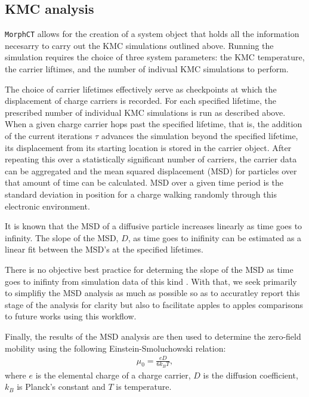 \subsection{KMC analysis}
\label{kmcanalysis}
\texttt{MorphCT} allows for the creation of a system object that holds all the information necesarry to carry out the
KMC simulations outlined above. Running the simulation requires the choice of three system parameters: the
KMC temperature, the carrier liftimes, and the number of indivual KMC simulations to perform.

The choice of carrier lifetimes effectively serve as checkpoints at which the displacement of charge carriers is recorded. For
each specified lifetime, the prescribed number of individual KMC simulations is run as described above. When a
given charge carrier hops past the specified lifetime, that is, the addition of the current iterations $\tau$ advances
the simulation beyond the specified lifetime, 
its displacement from its starting location is stored in the carrier object. After repeating this over a
statistically significant number of carriers, the carrier data can be aggregated and the mean squared
displacement (MSD) for particles over that amount of time can be calculated. MSD over a given time period is 
the standard deviation in position for a charge walking randomly through this electronic environment. 

It is known that the MSD of a diffusive particle increases linearly as time goes to infinity. 
The slope of the MSD, $D$, as time
goes to inifinity can be estimated as a linear fit between the MSD's at the specified lifetimes.

There is no objective best practice for determing the slope of the MSD as
time goes to inifinty from simulation data of this kind \cite{Maginn2018}. With that, we seek primarily to simplifiy the MSD analysis as much as
possible so as to accuratley report this stage of the analysis for clarity but also to facilitate apples to
apples comparisons to future works using this workflow. 

Finally, the results of the MSD analysis are then used to determine the zero-field mobility using the following Einstein-Smoluchowski relation:
\begin{align}
    \label{einstein}
    \mu_{0} = \frac{eD}{6k_{B}T},
\end{align}
where $e$ is the elemental charge of a charge carrier, $D$ is the diffusion coefficient, $k_{B}$ is Planck's
constant and $T$ is temperature. 

